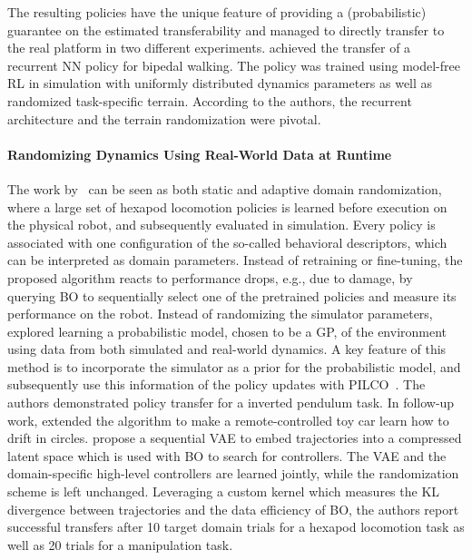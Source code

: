 \documentclass[utf8]{frontiersSCNS} %
\begin{document}
The resulting policies have the unique feature of providing a (probabilistic) guarantee on the estimated transferability and managed to directly transfer to the real platform in two different experiments.
%
\cite{Siekmann_Hurst_21} achieved the \simtoreal transfer of a recurrent \ac{NN} policy for bipedal walking.
The policy was trained using model-free \ac{RL} in simulation with uniformly distributed dynamics parameters as well as randomized task-specific terrain.
According to the authors, the recurrent architecture and the terrain randomization were pivotal.

\paragraph*{Randomizing Dynamics Using Real-World Data at Runtime}
%
The work by~\citet{Cully_etal_2015} can be seen as both static and adaptive domain randomization, where a large set of hexapod locomotion policies is learned before execution on the physical robot, and subsequently evaluated in simulation.
Every policy is associated with one configuration of the so-called behavioral descriptors, which can be interpreted as domain parameters.
Instead of retraining or fine-tuning, the proposed algorithm reacts to performance drops, e.g., due to damage, by querying \ac{BO} to sequentially select one of the pretrained policies and measure its performance on the robot.
%
Instead of randomizing the simulator parameters, \cite{Cutler_How_15} explored learning a probabilistic model, chosen to be a \ac{GP}, of the environment using data from both simulated and real-world dynamics.
A key feature of this method is to incorporate the simulator as a prior for the probabilistic model, and subsequently use this information of the policy updates with PILCO~\citep{Deisenroth_Rasmussen_11}.
The authors demonstrated policy transfer for a inverted pendulum task.
In follow-up work, \citet{Cutler_How_16} extended the algorithm to make a remote-controlled toy car learn how to drift in circles.
%
\citet{Antonova_Rai_Kragic_19} propose a sequential \ac{VAE} to embed trajectories into a compressed latent space which is used with \ac{BO} to search for controllers.
The \ac{VAE} and the domain-specific high-level controllers are learned jointly, while the randomization scheme is left unchanged.
Leveraging a custom kernel which measures the \ac{KL} divergence between trajectories and the data efficiency of \ac{BO}, the authors report successful \simtoreal transfers after 10 target domain trials for a hexapod locomotion task as well as 20 trials for a manipulation task.
\end{document}
